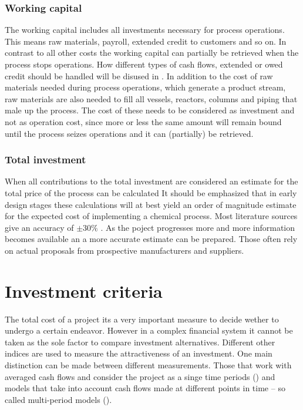 \subsubsection{Working capital}
The working capital includes all investments necessary for process operations. This means raw
materials, payroll, extended credit to customers and so on. In contrast to all other costs the 
working capital can partially be retrieved when the process stops operations. How different 
types of cash flows, extended or owed credit should be handled will be disused in 
. In addition to the cost of raw materials needed during process
operations, which generate a product stream, raw materials are also needed to fill all vessels, reactors, 
columns and piping that male up the process. The cost of these needs to be considered as investment 
and not as operation cost, since more or less the same amount will remain bound until 
the process seizes operations and it can (partially) be retrieved. 

 

\subsubsection{Total investment}
When all contributions to the total investment are considered an estimate for the total price of the 
process can be calculated
%
It should be emphasized that in early design stages these calculations will at best yield an order of
magnitude estimate for the expected cost of implementing a chemical process. Most literature sources 
give an accuracy of $\pm 30 \%$  \cite{Peters.2003}. As the poject progresses more and more information 
becomes available an a more accurate estimate can be prepared. Those often rely on actual proposals
from prospective manufacturers and suppliers. 


\section{Investment criteria}
\label{sec:InvestmentCriteria}
The total cost of a project its a very important measure to decide wether to undergo a certain endeavor. 
However in a complex financial system it cannot be taken as the sole factor to compare investment 
alternatives. Different other indices are used to measure the attractiveness of an investment. One 
main distinction can be made between different measurements. Those that work with averaged cash flows
and consider the project as a singe time periods () and models that take into 
account cash flows made at different points in time -- so called multi-period models 
().  


